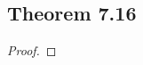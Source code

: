 \documentclass[../../main.tex]{subfiles}
\begin{document}
\subsection{Theorem 7.16}
\begin{wts}

\end{wts}
\begin{proof}

\end{proof}
\end{document}
